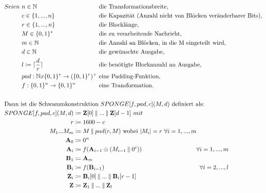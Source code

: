 	\begin{align*}
		&\begin{alignedat}[t]{2}
			Seien\ & n \in \mathbb{N} && \text{ die Transformationsbreite}, \\
			& c \in \{1,...,n\} && \text{ die Kapazität (Anzahl nicht von Blöcken veränderbarer Bits)}, \\
			& r \in \{1,...,n\} && \text{ die Blocklänge}, \\
			& M \in \{0,1\}^* && \text{ die zu verarbeitende Nachricht}, \\
			& m \in \mathbb{N} && \text{ die Anzahl an Blöcken, in die M eingeteilt wird}, \\
			& d \in \mathbb{N} && \text{ die gewünschte Ausgabe}, \\
			& l \coloneq \lceil \frac{d}{r} \rceil && \text{ die benötigte Blockanzahl an Ausgabe}, \\
			& pad: \mathbb{N}x\{0,1\}^* \to (\{0,1\}^r)^+ && \text{ eine Padding-Funktion}, \\
			& f: \{0,1\}^n \to \{0,1\}^n && \text{ eine Transformation}.
		\end{alignedat} \\
		\\
		&\text{Dann ist die Schwammkonstruktion } SPONGE[f,pad,c](M,d) \text{ definiert als:} \\
		&\begin{alignedat}[t]{3}
			SPONGE[f,pad,c](M, d) & \coloneq \mathbf{Z}[0] \mathbin\Vert ... \mathbin\Vert \mathbf{Z}[d-1]\ mit \\
			r & \coloneq 1600 - c \\
			M_1...M_{m} & \coloneq M \mathbin\Vert pad(r, M) \text{ wobei } |M_i| = r\ \forall i = 1,...,m\\
			\mathbf{A}_0 & \coloneq 0^n \\
			\mathbf{A}_i & \coloneq f(\mathbf{A}_{i-1} \oplus (M_{i-1} \mathbin\Vert 0^c))\ & \forall i = 1,...,m \\
			\mathbf{B}_1 & \coloneq \mathbf{A}_{m} \\
			\mathbf{B}_i & \coloneq f(\mathbf{B}_{i-1})\ & \forall i = 2,...,l \\
			\mathbf{Z}_i & \coloneq \mathbf{B}_i[0] \mathbin\Vert ... \mathbin\Vert \mathbf{B}_i[r-1] \\
			\mathbf{Z} & \coloneq \mathbf{Z}_1 \mathbin\Vert ... \mathbin\Vert \mathbf{Z}_l
		\end{alignedat}
	\end{align*}
	
